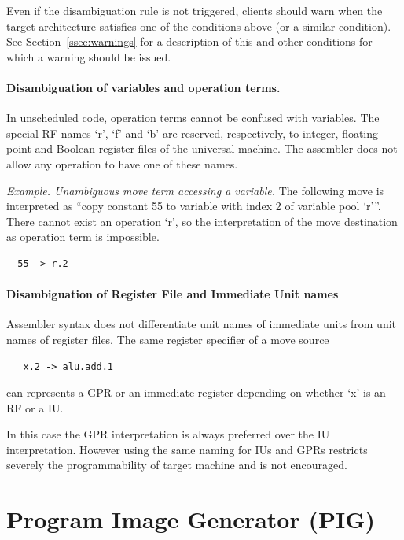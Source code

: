 \documentclass[a4paper,twoside]{tceusermanual}
\begin{document}
Even if the disambiguation rule is not triggered, clients should warn when
the target architecture satisfies one of the conditions above (or a
similar condition).  See Section~\ref{ssec:warnings} for a description of
this and other conditions for which a warning should be issued.

\paragraph{Disambiguation of variables and operation terms.}
In unscheduled code, operation terms cannot be confused with variables. 
The
special RF names `r', `f' and `b' are reserved, respectively, to integer,
floating-point and Boolean register files of the universal machine. The
assembler does not allow any operation to have one of these names.
%

\emph{Example. Unambiguous move term accessing a variable.} The following
move is interpreted as ``copy constant 55 to variable with index 2 of
variable pool `r'''. There cannot exist an operation `r', so the
interpretation of the move destination as operation term is impossible.
\begin{verbatim}
  55 -> r.2
\end{verbatim}

\paragraph{Disambiguation of Register File and Immediate Unit names}

Assembler syntax does not differentiate unit names of immediate units from
unit names of register files.  The same register specifier of a move source
\begin{verbatim}
   x.2 -> alu.add.1
\end{verbatim}
can represents a GPR or an immediate register depending on whether `x' is an
RF or a IU.

In this case the GPR interpretation is always preferred over the IU 
interpretation. However using the same naming for IUs and GPRs
restricts severely the programmability of target machine and is not
encouraged.




\section{Program Image Generator (PIG)}
\end{document}
